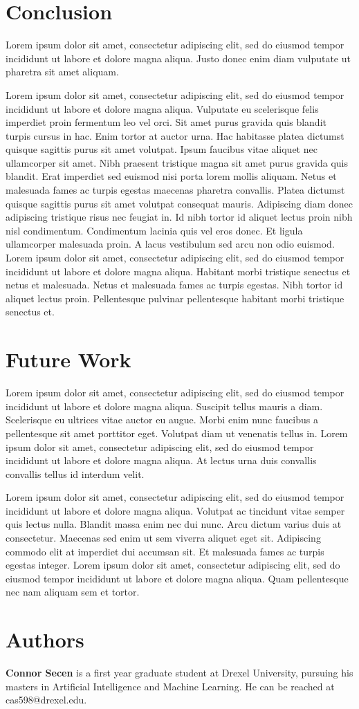 \documentclass{cup-ino}
\begin{document}
\section{Conclusion}
Lorem ipsum dolor sit amet, consectetur adipiscing elit, sed do eiusmod tempor incididunt ut labore et dolore magna aliqua. Justo donec enim diam vulputate ut pharetra sit amet aliquam.

Lorem ipsum dolor sit amet, consectetur adipiscing elit, sed do eiusmod tempor incididunt ut labore et dolore magna aliqua. Vulputate eu scelerisque felis imperdiet proin fermentum leo vel orci. Sit amet purus gravida quis blandit turpis cursus in hac. Enim tortor at auctor urna. Hac habitasse platea dictumst quisque sagittis purus sit amet volutpat. Ipsum faucibus vitae aliquet nec ullamcorper sit amet. Nibh praesent tristique magna sit amet purus gravida quis blandit. Erat imperdiet sed euismod nisi porta lorem mollis aliquam. Netus et malesuada fames ac turpis egestas maecenas pharetra convallis. Platea dictumst quisque sagittis purus sit amet volutpat consequat mauris. Adipiscing diam donec adipiscing tristique risus nec feugiat in. Id nibh tortor id aliquet lectus proin nibh nisl condimentum. Condimentum lacinia quis vel eros donec. Et ligula ullamcorper malesuada proin. A lacus vestibulum sed arcu non odio euismod. Lorem ipsum dolor sit amet, consectetur adipiscing elit, sed do eiusmod tempor incididunt ut labore et dolore magna aliqua. Habitant morbi tristique senectus et netus et malesuada. Netus et malesuada fames ac turpis egestas. Nibh tortor id aliquet lectus proin. Pellentesque pulvinar pellentesque habitant morbi tristique senectus et.

\section{Future Work}
Lorem ipsum dolor sit amet, consectetur adipiscing elit, sed do eiusmod tempor incididunt ut labore et dolore magna aliqua. Suscipit tellus mauris a diam. Scelerisque eu ultrices vitae auctor eu augue. Morbi enim nunc faucibus a pellentesque sit amet porttitor eget. Volutpat diam ut venenatis tellus in. Lorem ipsum dolor sit amet, consectetur adipiscing elit, sed do eiusmod tempor incididunt ut labore et dolore magna aliqua. At lectus urna duis convallis convallis tellus id interdum velit.

Lorem ipsum dolor sit amet, consectetur adipiscing elit, sed do eiusmod tempor incididunt ut labore et dolore magna aliqua. Volutpat ac tincidunt vitae semper quis lectus nulla. Blandit massa enim nec dui nunc. Arcu dictum varius duis at consectetur. Maecenas sed enim ut sem viverra aliquet eget sit. Adipiscing commodo elit at imperdiet dui accumsan sit. Et malesuada fames ac turpis egestas integer. Lorem ipsum dolor sit amet, consectetur adipiscing elit, sed do eiusmod tempor incididunt ut labore et dolore magna aliqua. Quam pellentesque nec nam aliquam sem et tortor.

\printbibliography

\section*{Authors}
\begin{authorbio}
\textbf{Connor Secen} is a first year graduate student at Drexel University, pursuing his masters in Artificial Intelligence and Machine Learning. He can be reached at cas598@drexel.edu.
\end{authorbio}
\end{document}
